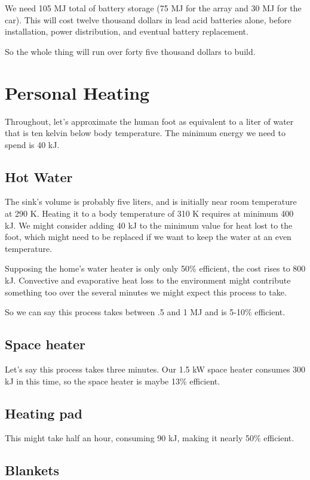 \documentclass[12pt]{article}
\begin{document}
We need 105 MJ total of battery storage (75 MJ for the array and 30 MJ for the car). This will cost twelve thousand dollars in lead acid batteries alone, before installation, power distribution, and eventual battery replacement.

So the whole thing will run over forty five thousand dollars to build.


\section{Personal Heating}

Throughout, let's approximate the human foot as equivalent to a liter of water that is ten kelvin below body temperature. The minimum energy we need to spend is 40 kJ.

\subsection{Hot Water}

The sink's volume is probably five liters, and is initially near room temperature at 290 K. Heating it to a body temperature of 310 K requires at minimum 400 kJ. We might consider adding 40 kJ to the minimum value for heat lost to the foot, which might need to be replaced if we want to keep the water at an even temperature.

Supposing the home's water heater is only only 50\% efficient, the cost rises to 800 kJ. Convective and evaporative heat loss to the environment might contribute something too over the several minutes we might expect this process to take. 

So we can say this process takes between .5 and 1 MJ and is 5-10\% efficient.

\subsection{Space heater}

Let's say this process takes three minutes. Our 1.5 kW space heater consumes 300 kJ in this time, so the space heater is maybe 13\% efficient.

\subsection{Heating pad}

This might take half an hour, consuming 90 kJ, making it nearly 50\% efficient.

\subsection{Blankets}
\end{document}
